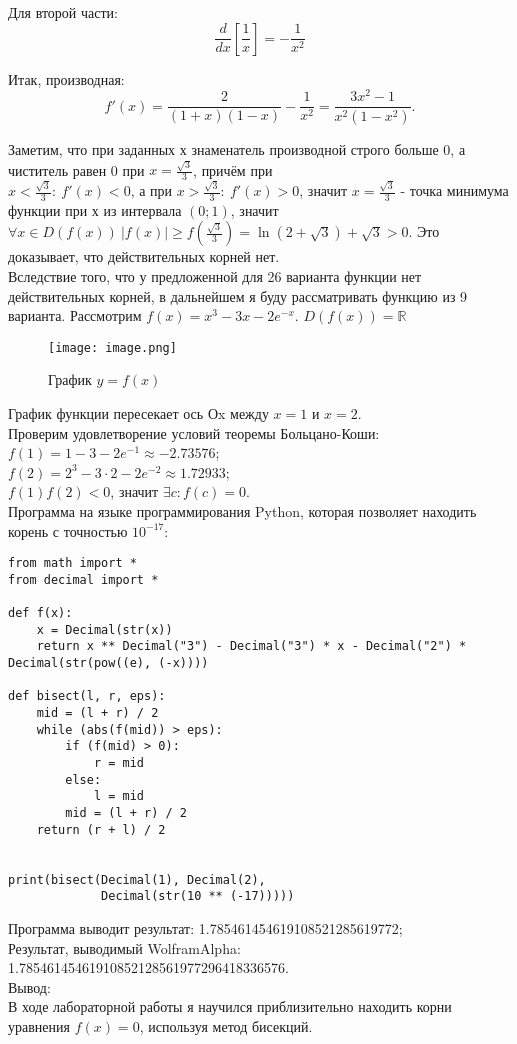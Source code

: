 \noindent Для второй части:
\[
\frac{d}{dx}\left[\frac{1}{x}\right] = -\frac{1}{x^2}
\]

\noindent Итак, производная:
\[
f'(x) = \frac{2}{(1+x)(1-x)} - \frac{1}{x^2} = \frac{3x^2-1}{x^2(1-x^2)}.
\]

\noindent Заметим, что при заданных х знаменатель производной строго больше 0, а чиститель равен 0 при $x = \frac{\sqrt{3}}{3}$, причём при $x < \frac{\sqrt{3}}{3}: \: f'(x) < 0 \text{, а при } x > \frac{\sqrt{3}}{3}: \: f'(x) > 0$, значит $x = \frac{\sqrt{3}}{3}$ - точка минимума функции при х из интервала $(0; 1)$, значит $\forall x \in D(f(x)) \: |{f(x)|} \geq f(\frac{\sqrt{3}}{3}) = \ln{(2+\sqrt{3})} + \sqrt{3} > 0$. Это доказывает, что действительных корней нет. \\
Вследствие того, что у предложенной для 26 варианта функции нет действительных корней, в дальнейшем я буду рассматривать функцию из 9 варианта. 
\newpage
Рассмотрим $f(x) = x^3 - 3x - 2e^{-x}$. $D(f(x)) = \mathbb{R}$
\begin{figure}[H]
    \centering
    \texttt{[image: image.png]}
    \caption{График $y = f(x)$}
\end{figure}
\noindent График функции пересекает ось Оx между $x=1$ и $x=2$. \\
Проверим удовлетворение условий теоремы Больцано-Коши: \\
$f(1) = 1 - 3 - 2e^{-1} \approx -2.73576$; \\
$f(2) = 2^3 - 3\cdot2 - 2e^{-2} \approx 1.72933$; \\
$f(1)f(2)<0$, значит $\exists c: f(c) = 0$. \\
Программа на языке программирования Python, которая позволяет находить корень с точностью $10^{-17}$: 
\begin{lstlisting}
from math import *
from decimal import *

def f(x):
    x = Decimal(str(x))
    return x ** Decimal("3") - Decimal("3") * x - Decimal("2") * Decimal(str(pow((e), (-x))))

def bisect(l, r, eps):
    mid = (l + r) / 2
    while (abs(f(mid)) > eps):
        if (f(mid) > 0):
            r = mid
        else:
            l = mid
        mid = (l + r) / 2
    return (r + l) / 2


print(bisect(Decimal(1), Decimal(2),
             Decimal(str(10 ** (-17)))))
\end{lstlisting}
Программа выводит результат: 1.785461454619108521285619772; \\
Результат, выводимый WolframAlpha: 1.78546145461910852128561977296418336576. \\
Вывод: \\
В ходе лабораторной работы я научился приблизительно находить корни уравнения $f(x)=0$, используя метод бисекций.


